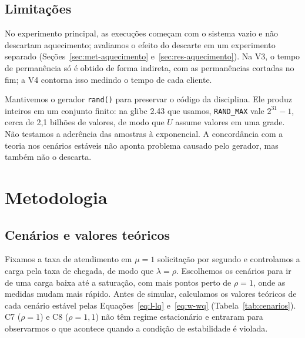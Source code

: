\documentclass[
  article,      %
  10pt,         %
  oneside,
  a4paper,
  twocolumn,    %
  english,
  brazil        %
]{abntex2}
\begin{document}
\subsection{Limitações}

No experimento principal, as execuções começam com o sistema vazio e não descartam aquecimento; avaliamos o efeito do descarte em um experimento separado (Seções~\ref{sec:met-aquecimento} e~\ref{sec:res-aquecimento}). Na V3, o tempo de permanência só é obtido de forma indireta, com as permanências cortadas no fim; a V4 contorna isso medindo o tempo de cada cliente.

Mantivemos o gerador \texttt{rand()} para preservar o código da disciplina. Ele produz inteiros em um conjunto finito: na glibc 2.43 que usamos, \texttt{RAND\_MAX} vale $2^{31}-1$, cerca de 2,1 bilhões de valores, de modo que $U$ assume valores em uma grade. Não testamos a aderência das amostras à exponencial. A concordância com a teoria nos cenários estáveis não aponta problema causado pelo gerador, mas também não o descarta.


\section{Metodologia}

\subsection{Cenários e valores teóricos}

Fixamos a taxa de atendimento em $\mu=1$ solicitação por segundo e controlamos a carga pela taxa de chegada, de modo que $\lambda=\rho$. Escolhemos os cenários para ir de uma carga baixa até a saturação, com mais pontos perto de $\rho=1$, onde as medidas mudam mais rápido. Antes de simular, calculamos os valores teóricos de cada cenário estável pelas Equações~\ref{eq:l-lq} e~\ref{eq:w-wq} (Tabela~\ref{tab:cenarios}). C7 ($\rho=1$) e C8 ($\rho=1{,}1$) não têm regime estacionário e entraram para observarmos o que acontece quando a condição de estabilidade é violada.
\end{document}
